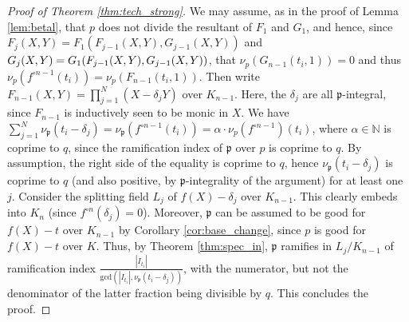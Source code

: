 \documentclass[a4paper]{amsart}
\begin{document}
\begin{proof}[Proof of Theorem \ref{thm:tech_strong}]
We may assume, as in the proof of Lemma \ref{lem:betal}, that $p$ does not divide the resultant of $F_1$ and $G_1$,
 and hence, since $F_j(X,Y)=F_1(F_{j-1}(X,Y), G_{j-1}(X,Y))$ and $G_j(X,Y)= G_1(F_{j-1}(X,Y), \\ G_{j-1}(X,Y))$, that $\nu_p(G_{n-1}(t_i,1))=0$ and thus $\nu_p(f^{\circ n-1}(t_i)) = \nu_p(F_{n-1}(t_i,1))$. 
Then write $F_{n-1}(X,Y)=\prod_{j=1}^N (X-\delta_jY)$ over $K_{n-1}$. Here, the $\delta_j$ are all $\mathfrak{p}$-integral, since $F_{n-1}$ is inductively seen to be monic in $X$. 
We have $\sum_{j=1}^N \nu_{\mathfrak{p}}(t_i-\delta_j) = \nu_{\mathfrak{p}}(f^{\circ n-1}(t_i)) = \alpha\cdot \nu_p(f^{\circ n-1})(t_i)$, where $\alpha\in \mathbb{N}$ is coprime to $q$, since the ramification index of $\mathfrak{p}$ over $p$ is coprime to $q$. By assumption, the right side of the equality is coprime to $q$, hence $\nu_{\mathfrak{p}}(t_i-\delta_j)$ is coprime to $q$ (and also positive, by $\mathfrak{p}$-integrality of the argument) for at least one $j$. 
Consider the splitting field $L_j$ of $f(X)-\delta_j$ over $K_{n-1}$. This clearly embeds into $K_n$ (since $f^{\circ n}(\delta_j)=0$). Moreover, $\mathfrak{p}$ can be assumed to be good for $f(X)-t$ over $K_{n-1}$ by Corollary \ref{cor:base_change}, since $p$ is good for $f(X)-t$ over $K$. Thus, by Theorem \ref{thm:spec_in}, $\mathfrak{p}$ ramifies in $L_j/K_{n-1}$ of ramification index $\frac{|I_{t_i}|}{\textrm{gcd}(|I_{t_i}|, \nu_{\mathfrak{p}}(t_i-\delta_j))}$, with the numerator, but not the denominator of the latter fraction being divisible by $q$. This concludes the proof.
  \end{proof}
  
  
    
\end{document}
